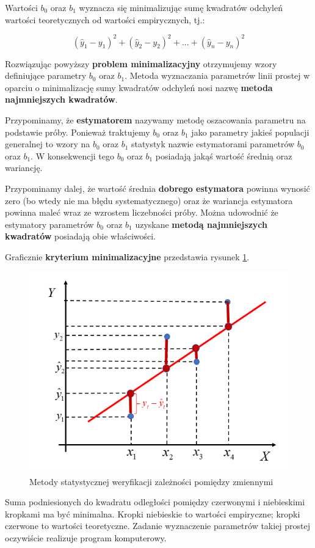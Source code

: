 \documentclass[
  openany]{book}
\begin{document}
Wartości \(b_0\) oraz \(b_1\) wyznacza się minimalizując sumę kwadratów
odchyleń wartości teoretycznych od wartości empirycznych, tj.:

\[(\hat y_1 - y_1)^2 + (\hat y_2 - y_2)^2 + ... +  (\hat y_n - y_n)^2\]

Rozwiązując powyższy \textbf{problem minimalizacyjny} otrzymujemy wzory
definiujące parametry \(b_0\) oraz \(b_1\). Metoda wyznaczania parametrów
linii prostej w oparciu o minimalizację sumy kwadratów odchyleń
nosi nazwę \textbf{metoda najmniejszych kwadratów}.

Przypominamy, że \textbf{estymatorem} nazywamy metodę oszacowania parametru na podstawie próby.
Ponieważ traktujemy \(b_0\) oraz \(b_1\) jako parametry jakieś populacji generalnej
to wzory na \(b_0\) oraz \(b_1\) statystyk nazwie estymatorami parametrów
\(b_0\) oraz \(b_1\). W konsekwencji tego \(b_0\) oraz \(b_1\) posiadają jakąś wartość średnią oraz wariancję.

Przypominamy dalej, że wartość średnia \textbf{dobrego estymatora} powinna wynosić zero (bo wtedy nie ma błędu systematycznego)
oraz że wariancja estymatora powinna maleć wraz ze wzrostem liczebności próby. Można udowodnić
że estymatory parametrów \(b_0\) oraz \(b_1\)
uzyskane \textbf{metodą najmniejszych kwadratów} posiadają obie właściwości.

Graficznie \textbf{kryterium minimalizacyjne} przedstawia rysunek \ref{fig:KMNK}.

\begin{figure}
\includegraphics[width=0.8\linewidth]{./kmnk_roznice} \caption{Metody statystycznej weryfikacji zależności pomiędzy zmiennymi}\label{fig:KMNK}
\end{figure}

Suma podniesionych do kwadratu odległości pomiędzy czerwonymi
i niebieskimi kropkami ma być minimalna. Kropki niebieskie to
wartości empiryczne; kropki czerwone to wartości teoretyczne.
Zadanie wyznaczenie
parametrów takiej prostej oczywiście realizuje program komputerowy.
\end{document}
